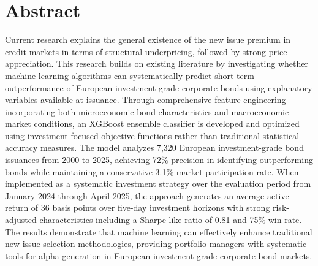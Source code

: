 \cleardoubleoddpage

\chapter*{Abstract}
\thispagestyle{empty} %

Current research explains the general existence of the new issue premium in credit markets in terms of structural underpricing, followed by strong price appreciation. This research builds on existing literature by investigating whether machine learning algorithms can systematically predict short-term outperformance of European investment-grade corporate bonds using explanatory variables available at issuance. Through comprehensive feature engineering incorporating both microeconomic bond characteristics and macroeconomic market conditions, an XGBoost ensemble classifier is developed and optimized using investment-focused objective functions rather than traditional statistical accuracy measures. The model analyzes 7,320 European investment-grade bond issuances from 2000 to 2025, achieving 72\% precision in identifying outperforming bonds while maintaining a conservative 3.1\% market participation rate. When implemented as a systematic investment strategy over the evaluation period from January 2024 through April 2025, the approach generates an average active return of 36 basis points over five-day investment horizons with strong risk-adjusted characteristics including a Sharpe-like ratio of 0.81 and 75\% win rate. The results demonstrate that machine learning can effectively enhance traditional new issue selection methodologies, providing portfolio managers with systematic tools for alpha generation in European investment-grade corporate bond markets.